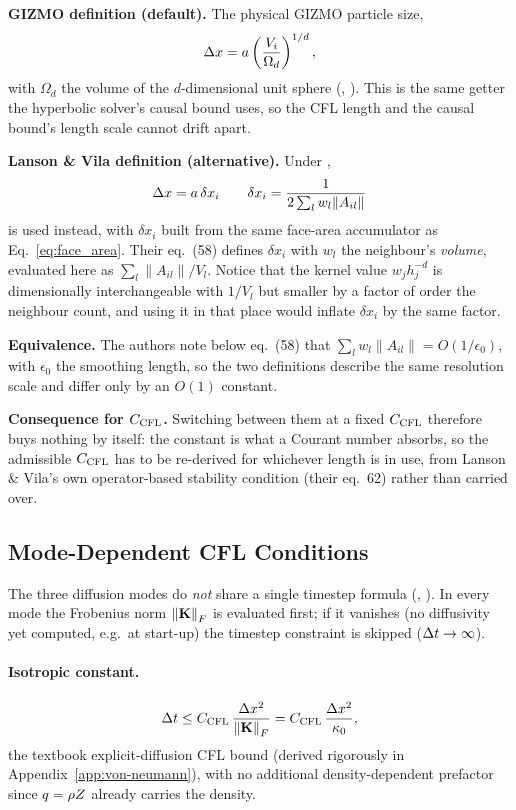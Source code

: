\textbf{GIZMO definition (default).} The physical GIZMO particle size,
\begin{equation}
  \Delta x = a \left(\frac{V_i}{\Omega_d}\right)^{1/d} ,
\end{equation}
with $\Omega_d$ the volume of the $d$-dimensional unit sphere
(, ).
This is the same getter the hyperbolic solver's causal bound uses, so
the CFL length and the causal bound's length scale cannot drift apart.

\textbf{Lanson \& Vila definition (alternative).} Under
,
\begin {equation}
  \Delta x = a\,\delta x_i \qquad \delta x_i = \frac{1}{2\sum_l w_l\|A_{il}\|}
\end{equation}
is used instead, with $\delta x_i$ built from the same face-area
accumulator as Eq.~\eqref{eq:face_area}. Their eq.~(58) defines
$\delta x_i$ with $w_l$ the neighbour's \emph{volume}, evaluated here
as $\sum_l\|A_{il}\|/V_l$. Notice that the kernel
value $w_jh_j^{-d}$ is dimensionally interchangeable with $1/V_l$ but
smaller by a factor of order the neighbour count, and using it in that
place would inflate $\delta x_i$ by the same factor.

\textbf{Equivalence.} The authors note below eq.~(58) that
$\sum_l w_l\|A_{il}\| = O(1/\epsilon_0)$, with $\epsilon_0$ the
smoothing length, so the two definitions describe the same resolution
scale and differ only by an $O(1)$ constant.

\textbf{Consequence for $C_{\mathrm{CFL}}$.} Switching between them at a fixed
$C_{\mathrm{CFL}}$ therefore buys nothing by itself: the constant is what a
Courant number absorbs, so the admissible $C_{\mathrm{CFL}}$ has to be re-derived
for whichever length is in use, from Lanson \& Vila's own
operator-based stability condition (their eq.~62) rather than carried
over.

\subsection{Mode-Dependent CFL Conditions}
\label{sec:cfl-modes}
The three diffusion modes do \emph{not} share a single timestep formula
(, ).
In every mode the Frobenius norm $\norm{\mathbf{K}}_F$ is evaluated first; if
it vanishes (no diffusivity yet computed, e.g.\ at start-up) the
timestep constraint is skipped ($\Delta t\to\infty$).

\paragraph{Isotropic constant.}
\begin{equation}
  \label{eq:dt_const}
  \Delta t \le C_{\mathrm{CFL}}\, \frac{\Delta x^2}{\norm{\mathbf{K}}_F} = C_{\mathrm{CFL}}\, \frac{\Delta x^2}{\kappa_{0}} ,
\end{equation}
the textbook explicit-diffusion CFL bound (derived rigorously in
Appendix~\ref{app:von-neumann}), with no additional density-dependent
prefactor since $q=\rho Z$ already carries the density.

